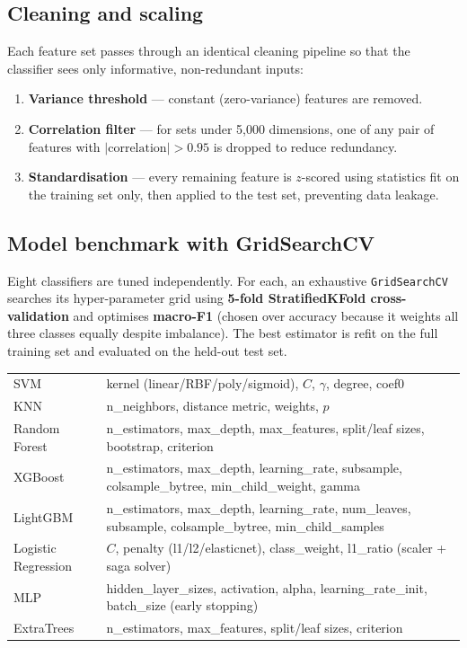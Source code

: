 \subsection{Cleaning and scaling}
Each feature set passes through an identical cleaning pipeline so that the classifier sees only
informative, non-redundant inputs:
\begin{enumerate}[leftmargin=1.6em,itemsep=2pt]
  \item \textbf{Variance threshold} --- constant (zero-variance) features are removed.
  \item \textbf{Correlation filter} --- for sets under 5{,}000 dimensions, one of any pair of
        features with $|\text{correlation}| > 0.95$ is dropped to reduce redundancy.
  \item \textbf{Standardisation} --- every remaining feature is $z$-scored using statistics fit on
        the training set only, then applied to the test set, preventing data leakage.
\end{enumerate}

\subsection{Model benchmark with GridSearchCV}
Eight classifiers are tuned independently. For each, an exhaustive \texttt{GridSearchCV} searches its
hyper-parameter grid using \textbf{5-fold StratifiedKFold cross-validation} and optimises
\textbf{macro-F1} (chosen over accuracy because it weights all three classes equally despite
imbalance). The best estimator is refit on the full training set and evaluated on the held-out test
set.

\begin{center}
\begin{tabularx}{\textwidth}{@{}l Y@{}}
\toprule
{} &  \\
\midrule
SVM & kernel (linear/RBF/poly/sigmoid), $C$, $\gamma$, degree, coef0 \\
KNN & n\_neighbors, distance metric, weights, $p$ \\
Random Forest & n\_estimators, max\_depth, max\_features, split/leaf sizes, bootstrap, criterion \\
XGBoost & n\_estimators, max\_depth, learning\_rate, subsample, colsample\_bytree, min\_child\_weight, gamma \\
LightGBM & n\_estimators, max\_depth, learning\_rate, num\_leaves, subsample, colsample\_bytree, min\_child\_samples \\
Logistic Regression & $C$, penalty (l1/l2/elasticnet), class\_weight, l1\_ratio (scaler + saga solver) \\
MLP & hidden\_layer\_sizes, activation, alpha, learning\_rate\_init, batch\_size (early stopping) \\
ExtraTrees & n\_estimators, max\_features, split/leaf sizes, criterion \\
\bottomrule
\end{tabularx}
\end{center}

